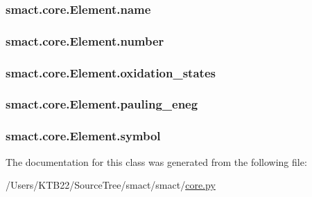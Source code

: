 \subsubsection[{name}]{\setlength{\rightskip}{0pt plus 5cm}smact.\+core.\+Element.\+name}\label{classsmact_1_1core_1_1_element_a89e5ff959b6f096dc9285694d5ab22bd}
\hypertarget{classsmact_1_1core_1_1_element_a4504f14ceab60eab6bb661a10a9314a5}{}
\subsubsection[{number}]{\setlength{\rightskip}{0pt plus 5cm}smact.\+core.\+Element.\+number}\label{classsmact_1_1core_1_1_element_a4504f14ceab60eab6bb661a10a9314a5}
\hypertarget{classsmact_1_1core_1_1_element_a48bcda32c64f4b012bb81d5e52b065eb}{}
\subsubsection[{oxidation\+\_\+states}]{\setlength{\rightskip}{0pt plus 5cm}smact.\+core.\+Element.\+oxidation\+\_\+states}\label{classsmact_1_1core_1_1_element_a48bcda32c64f4b012bb81d5e52b065eb}
\hypertarget{classsmact_1_1core_1_1_element_a9d9694ce9663754858c0f8218251628e}{}
\subsubsection[{pauling\+\_\+eneg}]{\setlength{\rightskip}{0pt plus 5cm}smact.\+core.\+Element.\+pauling\+\_\+eneg}\label{classsmact_1_1core_1_1_element_a9d9694ce9663754858c0f8218251628e}
\hypertarget{classsmact_1_1core_1_1_element_a6d08136e1d0c72c81fc84819df2dd445}{}
\subsubsection[{symbol}]{\setlength{\rightskip}{0pt plus 5cm}smact.\+core.\+Element.\+symbol}\label{classsmact_1_1core_1_1_element_a6d08136e1d0c72c81fc84819df2dd445}


The documentation for this class was generated from the following file\+:\begin{DoxyCompactItemize}
\item 
/\+Users/\+K\+T\+B22/\+Source\+Tree/smact/smact/\hyperlink{core_8py}{core.\+py}\end{DoxyCompactItemize}
